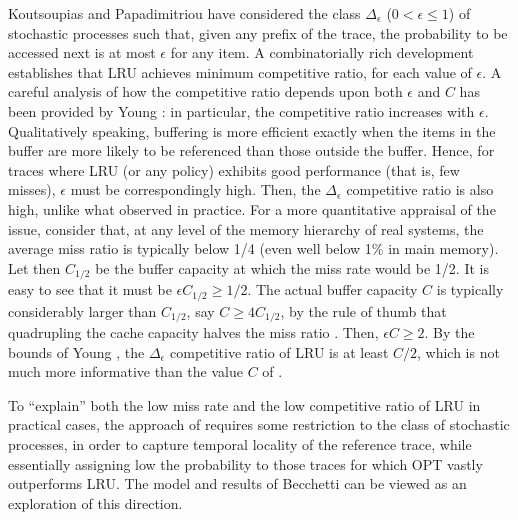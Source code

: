\documentclass[11pt,a4paper]{article}
\theoremstyle{definition}
\theoremstyle{remark}
\begin{document}
Koutsoupias and Papadimitriou \cite{KoutsoupiasP00} have considered
the class $\Delta_{\epsilon}$ ($0 < \epsilon \leq 1$) of stochastic
processes such that, given any prefix of the trace, the probability to
be accessed next is at most $\epsilon$ for any item.  A
combinatorially rich development establishes that LRU achieves minimum
competitive ratio, for each value of $\epsilon$.  A careful analysis
of how the competitive ratio depends upon both $\epsilon$ and $C$ has
been provided by Young \cite{Young98}: in particular, the competitive
ratio increases with $\epsilon$. Qualitatively speaking, buffering is
more efficient exactly when the items in the buffer are more likely to
be referenced than those outside the buffer. Hence, for traces where
LRU (or any policy) exhibits good performance (that is, few misses),
$\epsilon$ must be correspondingly high. Then, the $\Delta_{\epsilon}$
competitive ratio is also high, unlike what observed in practice.  For
a more quantitative appraisal of the issue, consider that, at any level
of the memory hierarchy of real systems, the average miss ratio is
typically below 1/4 (even well below 1\% in main memory). Let then
$C_{1/2}$ be the buffer capacity at which the miss rate would be
1/2. It is easy to see that it must be $\epsilon C_{1/2} \geq 1/2$.
The actual buffer capacity $C$ is typically considerably larger than
$C_{1/2}$, say $C \geq 4 C_{1/2}$, by the rule of thumb that
quadrupling the cache capacity halves the miss ratio
\cite{Przybylski90}.  Then, $\epsilon C \geq 2$. By the bounds of
Young \cite{Young98}, the $\Delta_{\epsilon}$ competitive ratio of LRU
is at least $C/2$, which is not much more informative than the value
$C$ of \cite{SleatorT85}.

To ``explain'' both the low miss rate and the low competitive ratio of
LRU in practical cases, the approach of \cite{KoutsoupiasP00} requires
some restriction to the class of stochastic processes, in order to
capture temporal locality of the reference trace, while essentially
assigning low the probability to those traces for which OPT vastly
outperforms LRU.  The model and results of Becchetti
\cite{Becchetti04} can be viewed as an exploration of this direction.
\end{document}
